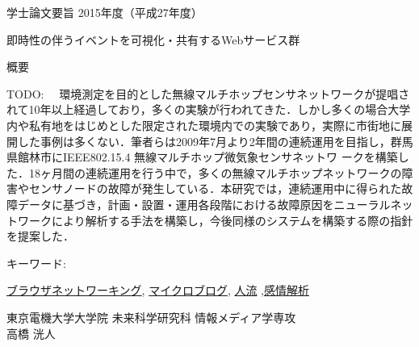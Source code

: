 \newpage
\pagestyle{plain}
\begin{center}
\LARGE{学士論文要旨 \hspace{10mm} 2015年度（平成27年度）}\\

\vspace{10mm}

\LARGE{即時性の伴うイベントを可視化・共有するWebサービス群}\\
\end{center}

\begin{center}
概要\\
\end{center}

TODO:　 環境測定を目的とした無線マルチホップセンサネットワークが提唱されて10年以上経過しており，多くの実験が行われてきた．しかし多くの場合大学内や私有地をはじめとした限定された環境内での実験であり，実際に市街地に展開した事例は多くない．筆者らは2009年7月より2年間の連続運用を目指し，群馬県館林市にIEEE802.15.4 無線マルチホップ微気象センサネットワ ークを構築した．18ヶ月間の連続運用を行う中で，多くの無線マルチホップネットワークの障害やセンサノードの故障が発生している．本研究では，連続運用中に得られた故障データに基づき，計画・設置・運用各段階における故障原因をニューラルネットワークにより解析する手法を構築し，今後同様のシステムを構築する際の指針を提案した．

\begin{flushleft}キーワード:\\
\end{flushleft}
{\underline{ブラウザネットワーキング}, \underline{マイクロブログ}, \underline{人流} ,\underline{感情解析} }


\begin{center}
\vspace{10mm}
\begin{flushright}\large 東京電機大学大学院 未来科学研究科 情報メディア学専攻\\
\LARGE 高橋 洸人\\
\end{flushright}
\end{center}

\newpage

